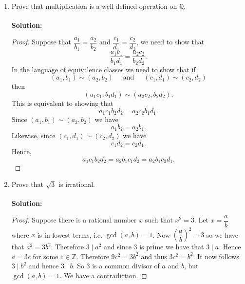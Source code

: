\documentclass[12pt,letterpaper]{article}
\theoremstyle{plain}
\theoremstyle{definition}
\begin{document}
\begin{enumerate}[1.]
\newpage
\item  Prove that multiplication is a well defined operation on $\mathbb{Q}$.\\
\ \\
{\bf Solution: }
\begin{proof}
Suppose that $\dfrac{a_1}{b_1}=\dfrac{a_2}{b_2}$ and $\dfrac{c_1}{d_1}=\dfrac{c_2}{d_2}$, we need to show that 
\[\frac{a_1c_1}{b_1d_1}=\frac{a_2c_2}{b_2d_2}.\]
In the language of equivalence classes we need to show that if 
\[(a_1,b_1)\sim (a_2, b_2)\ \ \ \ \ \text{ and } \ \ \ \ \ (c_1, d_1)\sim (c_2, d_2)\]
then 
\[(a_1c_1, b_1d_1)\sim (a_2c_2, b_2d_2).\]
This is equivalent to showing that 
\[a_1c_1 b_2 d_2 = a_2 c_2 b_1 d_1.\]
Since $(a_1, b_1)\sim (a_2, b_2)$ we have 
\[a_1b_2=a_2b_1.\]
Likewise, since $(c_1, d_1)\sim (c_2, d_2)$ we have 
\[c_1d_2=c_2d_1.\]
Hence, 
\[
a_1c_1 b_2 d_2 =a_2 b_1 c_1 d_2= a_2 b_1 c_2 d_1.
\]


\end{proof}
\item Prove that $\sqrt{3}$ is irrational. \\
\ \\
{\bf Solution: }
\begin{proof} Suppose there is a rational number $x$ such that $x^2=3$. Let $x=\dfrac{a}{b}$ where $x$ is in lowest terms, i.e. $\gcd(a,b)=1$. Now $\left(\dfrac{a}{b}\right)^2=3$ so we have that $a^2=3 b^2$. Therefore $3\mid a^2 $ and since $3$ is prime we have that $3\mid a$. Hence $a=3c$ for some $c\in \mathbb{Z}$. Therefore $9c^2=3b^2$ and thus $3c^2 = b^2$. It now follows $3\mid b^2$ and hence $3\mid b$. So $3$ is a common divisor of $a$ and $b$, but $\gcd(a,b)=1$. We have a contradiction.
\end{proof}

\end{enumerate}
\end{document}
